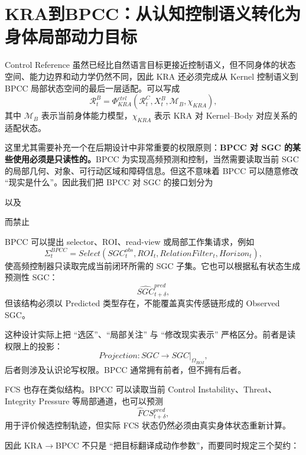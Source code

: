 \section{KRA到BPCC：从认知控制语义转化为身体局部动力目标}

Control Reference 虽然已经比自然语言目标更接近控制语义，但不同身体的状态空间、能力边界和动力学仍然不同，因此 KRA 还必须完成从 Kernel 控制语义到 BPCC 局部状态空间的最后一层适配。可以写成
\[
\mathcal R^{B}_t
=
\Phi^{ctrl}_{KRA}
\left(
\mathcal R^C_t,
X^B_t,
\mathcal M_B,
\chi_{KRA}
\right),
\]
其中 $\mathcal M_B$ 表示当前身体能力模型，$\chi_{KRA}$ 表示 KRA 对 Kernel--Body 对应关系的适配状态。

这里尤其需要补充一个在后期设计中非常重要的权限原则：\textbf{BPCC 对 SGC 的某些使用必须是只读性的。}BPCC 为实现高频预测和控制，当然需要读取当前 SGC 的局部几何、对象、可行动区域和障碍信息。但这不意味着 BPCC 可以随意修改 ``现实是什么''。因此我们把 BPCC 对 SGC 的接口划分为
\begin{statementbox}
\centering
{}
\end{statementbox}
以及
\begin{statementbox}
\centering
{}
\end{statementbox}
而禁止
\begin{statementbox}
\centering
{}
\end{statementbox}

BPCC 可以提出 selector、ROI、read-view 或局部工作集请求，例如
\[
\Sigma^{BPCC}_t
=
Select
\left(
SGC^{obs}_t,
ROI_t,
RelationFilter_t,
Horizon_t
\right),
\]
使高频控制器只读取完成当前闭环所需的 SGC 子集。它也可以根据私有状态生成预测性 SGC：
\[
\hat{SGC}^{pred}_{t+\delta},
\]
但该结构必须以 Predicted 类型存在，不能覆盖真实传感链形成的 Observed SGC。

这种设计实际上把 ``选区''、``局部关注'' 与 ``修改现实表示'' 严格区分。前者是读权限上的投影：
\[
Projection:
SGC\rightarrow SGC|_{\Omega_{ROI}},
\]
后者则涉及认识论写权限。BPCC 通常拥有前者，但不拥有后者。

FCS 也存在类似结构。BPCC 可以读取当前 Control Instability、Threat、Integrity Pressure 等局部通道，也可以预测
\[
\hat FCS^{pred}_{t+\delta},
\]
用于评价候选控制轨迹，但实际 FCS 状态仍然必须由真实身体状态重新计算。

因此 KRA$\rightarrow$BPCC 不只是 ``把目标翻译成动作参数''，而要同时规定三个契约：


